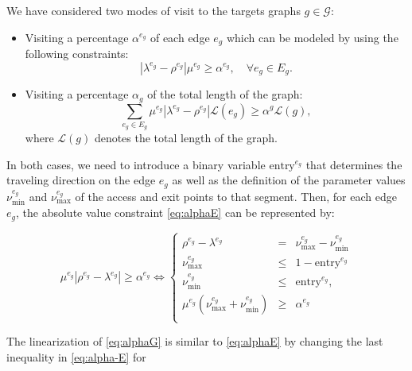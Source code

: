 \noindent
We have considered two modes of visit to the targets graphs $g\in \mathcal{G}$:
\begin{itemize}
    \item Visiting a percentage $\alpha^{e_g}$ of each edge $e_g$ which can be modeled by using the following constraints:
    \begin{equation}\label{eq:alphaE}\tag{$\alpha$-E}
    |\lambda^{e_g} - \rho^{e_g}|\mu^{e_g}\geq \alpha^{e_g}, \quad \forall e_g\in E_g.
    \end{equation}
    \item Visiting a percentage $\alpha_g$ of the total length of the graph:
    \begin{equation}\label{eq:alphaG}\tag{$\alpha$-G}
    \sum_{e_g\in E_g} \mu^{e_g}|\lambda^{e_g} - \rho^{e_g}|\mathcal L(e_g) \geq \alpha^g\mathcal L(g),
    \end{equation}
    where $\mathcal L(g)$ denotes the total length of the graph.
\end{itemize}

\bigskip
\noindent
In both cases, we need to introduce a binary variable $\text{entry}^{e_g}$ that determines the traveling direction on the edge $e_g$ as well as the definition of the parameter values $\nu_\text{min}^{e_g}$ and $\nu_\text{max}^{e_g}$ of the access and exit points to that segment. Then, for each edge $e_g$, the absolute value constraint \eqref{eq:alphaE} can be represented by:

\begin{equation}\label{eq:alpha-E}\tag{$\alpha$-E}
 \mu^{e_g}|\rho^{e_g}-\lambda^{e_g}|\geq \alpha^{e_g} \Longleftrightarrow
 \left\{
 \begin{array}{ccl}
  \rho^{e_g} - \lambda^{e_g}                       & =    & \nu_\text{max}^{e_g} - \nu_\text{min}^{e_g}                                     \\
  \nu_\text{max}^{e_g}                         & \leq & 1-{\text{entry}^{e_g}}                                    \\
  \nu_\text{min}^{e_g}                      & \leq & {  \text{entry}^{e_g}},                                        \\
  \mu^{e_g}(\nu_\text{max}^{e_g} + \nu_\text{min}^{e_g} ) & \geq & \alpha^{e_g}
  \\
 \end{array}
 \right.
\end{equation}

\noindent
The linearization of \eqref{eq:alphaG} is similar to \eqref{eq:alphaE} by changing the last inequality in \eqref{eq:alpha-E} for

